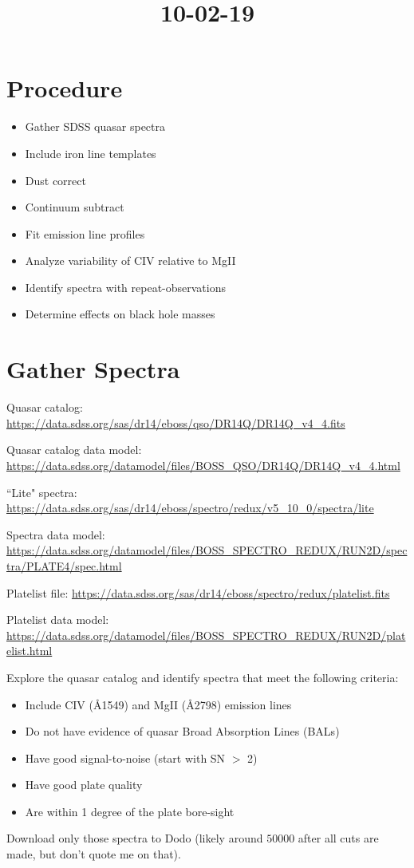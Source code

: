 \documentclass[12pt]{article}
\begin{document}
\title{10-02-19}
\author{}
\maketitle
    \section{Procedure}
        \begin{itemize}
            \item Gather SDSS quasar spectra
            \item Include iron line templates
            \item Dust correct
            \item Continuum subtract
            \item Fit emission line profiles
            \item Analyze variability of CIV relative to MgII
            \item Identify spectra with repeat-observations
            \item Determine effects on black hole masses
        \end{itemize}

    \section{Gather Spectra}
        Quasar catalog: \url{https://data.sdss.org/sas/dr14/eboss/qso/DR14Q/DR14Q_v4_4.fits}

        Quasar catalog data model: \url{https://data.sdss.org/datamodel/files/BOSS_QSO/DR14Q/DR14Q_v4_4.html}

        ``Lite" spectra: \url{https://data.sdss.org/sas/dr14/eboss/spectro/redux/v5_10_0/spectra/lite}

        Spectra data model: \url{https://data.sdss.org/datamodel/files/BOSS_SPECTRO_REDUX/RUN2D/spectra/PLATE4/spec.html}

        Platelist file: \url{https://data.sdss.org/sas/dr14/eboss/spectro/redux/platelist.fits}

        Platelist data model: \url{https://data.sdss.org/datamodel/files/BOSS_SPECTRO_REDUX/RUN2D/platelist.html}

        Explore the quasar catalog and identify spectra that meet the following criteria:

        \begin{itemize}
            \item Include CIV (\AA 1549) and MgII (\AA 2798) emission lines
            \item Do not have evidence of quasar Broad Absorption Lines (BALs)
            \item Have good signal-to-noise (start with SN $>$ 2)
            \item Have good plate quality
            \item Are within 1 degree of the plate bore-sight
        \end{itemize}

        Download only those spectra to Dodo (likely around $50000$ after all cuts are made, but don't quote me on that).
\end{document}

